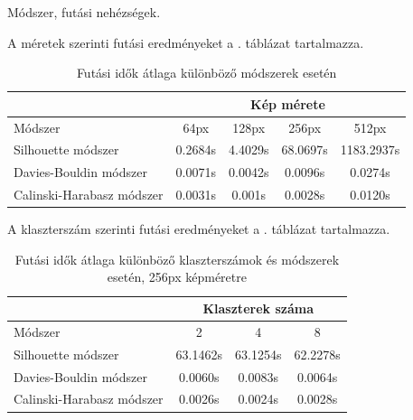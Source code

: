 
Módszer, futási nehézségek.


A méretek szerinti futási eredményeket a . táblázat tartalmazza.

\begin{table}[h]
\centering
\caption{Futási idők átlaga különböző módszerek esetén}
\label{tab:size_runtimes}
\medskip
\begin{tabular}{|l|c|c|c|c|}
\cline{2-5}
 \multicolumn{1}{c|}{} & \multicolumn{4}{c|}{Kép mérete} \\
 \hline
 Módszer & 64px & 128px & 256px & 512px \\
\hline
Silhouette módszer & 0.2684s & 4.4029s & 68.0697s & 1183.2937s \\
Davies-Bouldin módszer & 0.0071s & 0.0042s & 0.0096s & 0.0274s \\
Calinski-Harabasz módszer & 0.0031s & 0.001s & 0.0028s & 0.0120s \\
\hline
\end{tabular}
\end{table}

A klaszterszám szerinti futási eredményeket a . táblázat tartalmazza.

\begin{table}[h]
\centering
\caption{Futási idők átlaga különböző klaszterszámok és módszerek esetén, 256px képméretre}
\label{tab:cluster_runtimes}
\medskip
\begin{tabular}{|l|c|c|c|}
\cline{2-4}
 \multicolumn{1}{c|}{} & \multicolumn{3}{c|}{Klaszterek száma} \\
 \hline
 Módszer & 2 & 4 & 8 \\
\hline
Silhouette módszer & 63.1462s & 63.1254s & 62.2278s \\
Davies-Bouldin módszer & 0.0060s & 0.0083s & 0.0064s \\
Calinski-Harabasz módszer & 0.0026s & 0.0024s & 0.0028s \\
\hline
\end{tabular}
\end{table}
